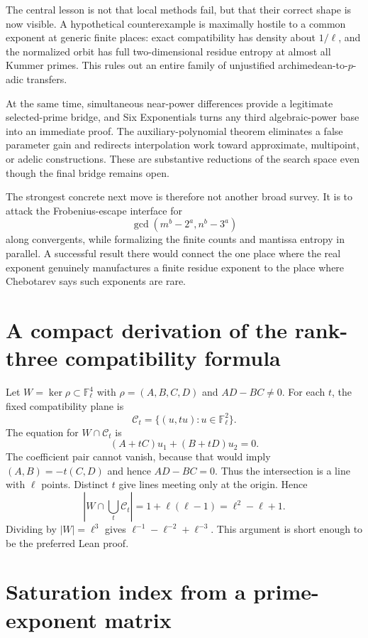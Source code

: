\documentclass[11pt,oneside]{article}
\theoremstyle{definition}
\theoremstyle{remark}
\newcommand{\F}{\mathbb{F}}
\begin{document}
The central lesson is not that local methods fail, but that their correct
shape is now visible.  A hypothetical counterexample is maximally hostile to
a common exponent at generic finite places: exact compatibility has density
about $1/\ell$, and the normalized orbit has full two-dimensional residue
entropy at almost all Kummer primes.  This rules out an entire family of
unjustified archimedean-to-$p$-adic transfers.

At the same time, simultaneous near-power differences provide a legitimate
selected-prime bridge, and Six Exponentials turns any third algebraic-power
base into an immediate proof.  The auxiliary-polynomial theorem eliminates
a false parameter gain and redirects interpolation work toward approximate,
multipoint, or adelic constructions.  These are substantive reductions of
the search space even though the final bridge remains open.

The strongest concrete next move is therefore not another broad survey.  It
is to attack the Frobenius-escape interface for
\[
 \gcd(m^b-2^a,n^b-3^a)
\]
along convergents, while formalizing the finite counts and mantissa entropy in
parallel.  A successful result there would connect the one place where the
real exponent genuinely manufactures a finite residue exponent to the place
where Chebotarev says such exponents are rare.

\appendix

\section{A compact derivation of the rank-three compatibility formula}

Let $W=\ker\rho\subset\F_\ell^4$ with
$\rho=(A,B,C,D)$ and $AD-BC\ne0$.  For each $t$, the fixed compatibility
plane is
\[
 \mathcal C_t=\{(u,tu):u\in\F_\ell^2\}.
\]
The equation for $W\cap\mathcal C_t$ is
\[
 (A+tC)u_1+(B+tD)u_2=0.
\]
The coefficient pair cannot vanish, because that would imply
$(A,B)=-t(C,D)$ and hence $AD-BC=0$.  Thus the intersection is a line with
$\ell$ points.  Distinct $t$ give lines meeting only at the origin.  Hence
\[
 \left|W\cap\bigcup_t\mathcal C_t\right|
 =1+\ell(\ell-1)=\ell^2-\ell+1.
\]
Dividing by $|W|=\ell^3$ gives
$\ell^{-1}-\ell^{-2}+\ell^{-3}$.  This argument is short enough to be the
preferred Lean proof.

\section{Saturation index from a prime-exponent matrix}
\end{document}
